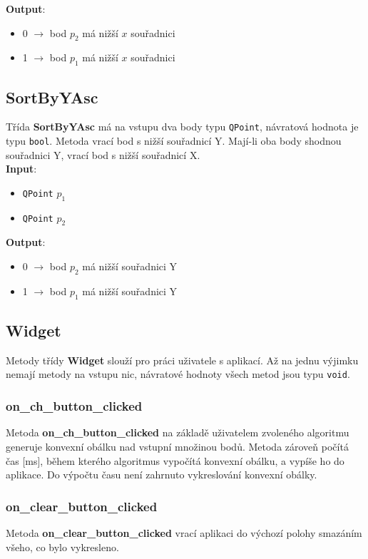 \documentclass[a4paper, 12pt]{article}
\begin{document}
\textbf{Output}:
\begin{itemize}
\item 0 $\rightarrow$ bod $p_2$ má nižší $x$ souřadnici
\item 1 $\rightarrow$ bod $p_1$ má nižší $x$ souřadnici
\end{itemize}

\subsection{SortByYAsc}
Třída \textbf{SortByYAsc} má na vstupu dva body typu \texttt{QPoint}, návratová hodnota je typu \texttt{bool}. Metoda vrací bod s nižší  souřadnicí Y. Mají-li oba body shodnou souřadnici Y, vrací bod s nižší souřadnicí X.\\

\textbf{Input}:
\begin{itemize}
\item \texttt{QPoint} $p_1$
\item \texttt{QPoint} $p_2$
\end{itemize}

\textbf{Output}:
\begin{itemize}
\item 0 $\rightarrow$ bod $p_2$ má nižší souřadnici Y
\item 1 $\rightarrow$ bod $p_1$ má nižší souřadnici Y
\end{itemize}

\subsection{Widget}
Metody třídy \textbf{Widget} slouží pro práci uživatele s aplikací. Až na jednu výjimku nemají metody na vstupu nic, návratové hodnoty všech metod jsou typu \texttt{void}.

\subsubsection{on\_ch\_button\_clicked}
Metoda \textbf{on\_ch\_button\_clicked} na základě uživatelem zvoleného algoritmu generuje konvexní obálku nad vstupní množinou bodů. Metoda zároveň počítá čas [ms], během kterého algoritmus vypočítá konvexní obálku, a vypíše ho do aplikace. Do výpočtu času není zahrnuto vykreslování konvexní obálky.

\subsubsection{on\_clear\_button\_clicked}
Metoda \textbf{on\_clear\_button\_clicked} vrací aplikaci do výchozí polohy smazáním všeho, co bylo vykresleno. 
\end{document}

